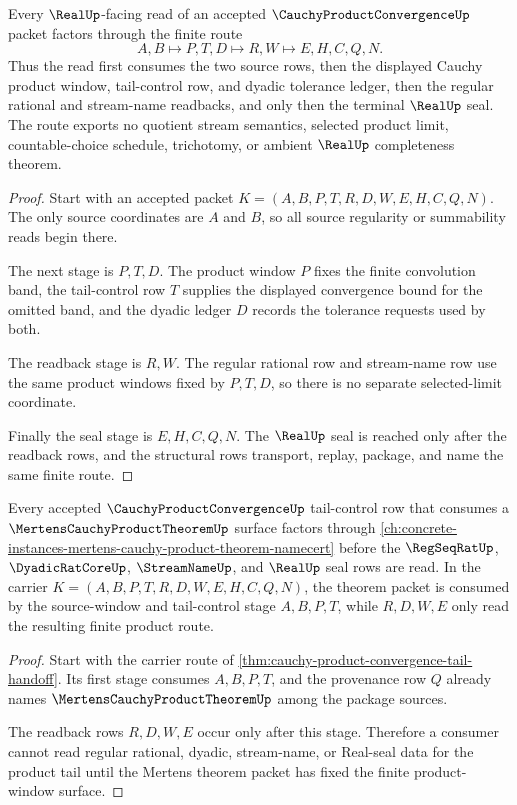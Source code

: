 \begin{theorem}
\label{thm:cauchy-product-convergence-tail-handoff}
Every $\RealUp$-facing read of an accepted $\CauchyProductConvergenceUp$ packet factors through the finite route
$$
A,B \longmapsto P,T,D \longmapsto R,W \longmapsto E,H,C,Q,N .
$$
Thus the read first consumes the two source rows, then the displayed Cauchy product window, tail-control row, and dyadic tolerance ledger, then the regular rational and stream-name readbacks, and only then the terminal $\RealUp$ seal. The route exports no quotient stream semantics, selected product limit, countable-choice schedule, trichotomy, or ambient $\RealUp$ completeness theorem.
\end{theorem}
\begin{proof}
Start with an accepted packet $K=(A,B,P,T,R,D,W,E,H,C,Q,N)$. The only source coordinates are $A$ and $B$, so all source regularity or summability reads begin there.

The next stage is $P,T,D$. The product window $P$ fixes the finite convolution band, the tail-control row $T$ supplies the displayed convergence bound for the omitted band, and the dyadic ledger $D$ records the tolerance requests used by both.

The readback stage is $R,W$. The regular rational row and stream-name row use the same product windows fixed by $P,T,D$, so there is no separate selected-limit coordinate.

Finally the seal stage is $E,H,C,Q,N$. The $\RealUp$ seal is reached only after the readback rows, and the structural rows transport, replay, package, and name the same finite route.
\end{proof}

\begin{theorem}
\label{thm:cauchy-product-convergence-tail-budget-fusion}
Every accepted $\CauchyProductConvergenceUp$ tail-control row that consumes a $\MertensCauchyProductTheoremUp$ surface factors through \autoref{ch:concrete-instances-mertens-cauchy-product-theorem-namecert} before the $\RegSeqRatUp$, $\DyadicRatCoreUp$, $\StreamNameUp$, and $\RealUp$ seal rows are read. In the carrier $K=(A,B,P,T,R,D,W,E,H,C,Q,N)$, the theorem packet is consumed by the source-window and tail-control stage $A,B,P,T$, while $R,D,W,E$ only read the resulting finite product route.
\end{theorem}
\begin{proof}
Start with the carrier route of \autoref{thm:cauchy-product-convergence-tail-handoff}. Its first stage consumes $A,B,P,T$, and the provenance row $Q$ already names $\MertensCauchyProductTheoremUp$ among the package sources.

The readback rows $R,D,W,E$ occur only after this stage. Therefore a consumer cannot read regular rational, dyadic, stream-name, or Real-seal data for the product tail until the Mertens theorem packet has fixed the finite product-window surface.
\end{proof}

